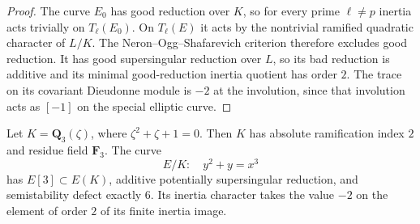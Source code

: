 \begin{proof}
The curve $E_0$ has good reduction over $K$, so for every prime
$\ell\ne p$ inertia acts trivially on $T_\ell(E_0)$. On $T_\ell(E)$ it
acts by the nontrivial ramified quadratic character of $L/K$. The
Neron--Ogg--Shafarevich criterion\cite[Theorem~1]{SerreTate1968Good} therefore excludes good reduction.
It has good supersingular reduction over $L$, so its bad reduction is
additive and its minimal good-reduction inertia quotient has order $2$.
The trace on its covariant Dieudonne module is $-2$ at the involution,
since that involution acts as $[-1]$ on the special elliptic curve.
\end{proof}

\begin{theorem}\label{thm:B-RD2}
Let $K=\mathbf Q_3(\zeta)$, where $\zeta^2+\zeta+1=0$. Then $K$ has
absolute ramification index $2$ and residue field $\mathbf F_3$. The curve
\[
 E/K:\quad y^2+y=x^3
\]
has $E[3]\subset E(K)$, additive potentially supersingular reduction,
and semistability defect exactly $6$. Its inertia character takes the
value $-2$ on the element of order $2$ of its finite inertia image.
\end{theorem}
